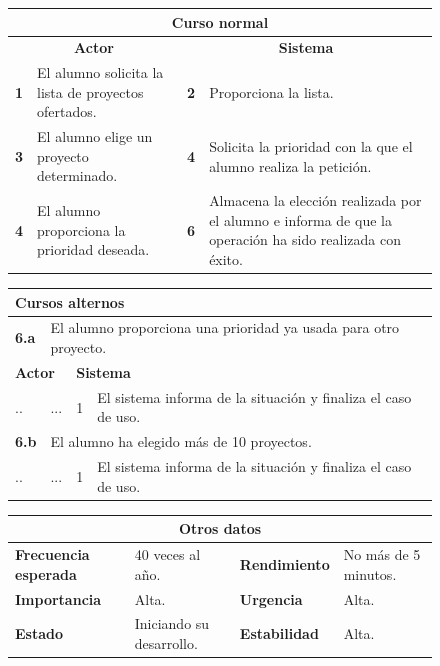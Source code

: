 \documentclass[12pt,spanish]{article}
\begin{document}
\begin{figure}[H]
\centering
\begin{tabular}{|m{5pt}|m{7.33cm}|m{5pt}|m{7.33cm}|}
\hline
\multicolumn{4}{|c|}{\textbf{Curso normal}} \\
\hline
\multicolumn{2}{|c}{\textbf{Actor}} & \multicolumn{2}{|c|}{\textbf{Sistema}} \\
\hline
\textbf{1} & El alumno solicita la lista de proyectos ofertados. & \textbf{2} & Proporciona la lista. \\
\hline
\textbf{3} & El alumno elige un proyecto determinado. & \textbf{4} & Solicita la prioridad con la que el alumno realiza la petición. \\
\hline
\textbf{4} & El alumno proporciona la prioridad deseada. & \textbf{6} & Almacena la elección realizada por el alumno e informa de que la operación ha sido realizada con éxito. \\
\hline
\end{tabular}

\vspace{0.5cm}

\begin{tabular}{|m{15pt}|m{7.15cm}|m{6pt}|m{7.15cm}|}
\hline
\multicolumn{4}{|m{16.2cm}|}{\textbf{Cursos alternos}} \\
\hline
\textbf{6.a} & \multicolumn{3}{l|}{El alumno proporciona una prioridad ya usada para otro proyecto.}  \\
\hline
\multicolumn{2}{|m{7.2cm}}{\textbf{Actor}} & \multicolumn{2}{|m{7.2cm}|}{\textbf{Sistema}} \\
\hline
.. & ... & 1 & El sistema informa de la situación y finaliza el caso de uso. \\
\hline
\textbf{6.b} & \multicolumn{3}{l|}{El alumno ha elegido más de 10 proyectos.}  \\
\hline
.. & ... & 1 & El sistema informa de la situación y finaliza el caso de uso. \\
\hline
\end{tabular}

\vspace{0.5cm}

\begin{tabular}{|m{3.75cm}|m{3.75cm}|m{3.75cm}|m{3.8cm}|}
\hline
\multicolumn{4}{|c|}{\textbf{Otros datos}} \\
\hline
\textbf{Frecuencia esperada} & 40 veces al año. & \textbf{Rendimiento} & No más de 5 minutos. \\
\hline
\textbf{Importancia} & Alta. & \textbf{Urgencia} & Alta. \\
\hline
\textbf{Estado} & Iniciando su desarrollo. & \textbf{Estabilidad} & Alta. \\
\hline
\end{tabular}


\end{figure}
\end{document}
